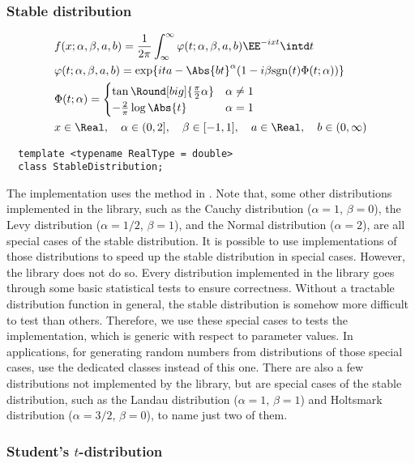 \subsubsection{Stable distribution}
\begin{align*}
  &f(x;\alpha,\beta,a,b) = \frac{1}{2\pi}\int_{\infty}^{\infty}
  \varphi(t;\alpha,\beta,a,b)\EE^{-ixt}\intd t\\
  &\varphi(t;\alpha,\beta,a,b) = \exp\{ita - \Abs{bt}^{\alpha}(1 -
  i\beta\mathrm{sgn}(t)\Phi(t;\alpha))\} \\
  &\Phi(t;\alpha) = \begin{cases}
    \tan\Round[big]{\frac{\pi}{2}\alpha} & \alpha \ne 1 \\
    -\frac{2}{\pi}\log\Abs{t}            & \alpha = 1
  \end{cases} \\
  & x \in \Real,\quad
  \alpha \in (0, 2],\quad \beta \in [-1, 1],\quad
  a \in \Real,\quad b \in (0, \infty)
\end{align*}
\begin{Verbatim}
  template <typename RealType = double>
  class StableDistribution;
\end{Verbatim}
The implementation uses the method in \cite{Chambers:1976dv}. Note that, some
other distributions implemented in the library, such as the Cauchy distribution
($\alpha = 1$, $\beta = 0$), the Levy distribution ($\alpha = 1/2$, $\beta =
1$), and the Normal distribution ($\alpha = 2$), are all special cases of the
stable distribution. It is possible to use implementations of those
distributions to speed up the stable distribution in special cases. However,
the library does not do so. Every distribution implemented in the library goes
through some basic statistical tests to ensure correctness. Without a tractable
distribution function in general, the stable distribution is somehow more
difficult to test than others. Therefore, we use these special cases to tests
the implementation, which is generic with respect to parameter values. In
applications, for generating random numbers from distributions of those special
cases, use the dedicated classes instead of this one. There are also a few
distributions not implemented by the library, but are special cases of the
stable distribution, such as the Landau distribution ($\alpha = 1$, $\beta =
1$) and Holtsmark distribution ($\alpha = 3/2$, $\beta = 0$), to name just two
of them.

\subsubsection{Student's $t$-distribution}

